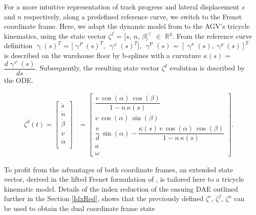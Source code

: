 \begin{sloppypar}
For a more intuitive representation of track progress and lateral displacement $s$ and $n$ respectively, along a predefined reference curve, we switch to the Frenet coordinate frame. Here, we adapt the dynamic model from \cite{kloeser_nmpc_2020} to the AGV's tricycle kinematics, using the state vector $\zeta^{f}$ = [$s$, $n$, $\beta$]$\mathrm{^{\top}}$ $\in$ $\mathbb{R}$$\mathrm{^{3}}$. From the reference curve definition $\upgamma(s)^T$ = [$\upgamma^{P}(s)^{T}$, $\upgamma^{\varphi}(s)^{T}$], $\upgamma^{\mathrm{P}}(s)$  = $[\upgamma^{x}(s), \upgamma^{y}(s)]^T$ is described on the warehouse floor by b-splines with a curvature $\kappa(s)$ =  $\dfrac{d \upgamma^{\varphi}(s)}{d{s}}$. Subsequently, the resulting state vector $\zeta^{d}$ evolution is described by the \ac{ODE}.
\end{sloppypar}
\begin{align}
    \dot{\zeta^{d}}(t) = \begin{bmatrix}
        \dot{s}\\
        \dot{n}\\
        \dot{\beta}\\
        \dot{v}\\
        \dot{\alpha}\\
    \end{bmatrix} &= 
    \begin{bmatrix}
        \dfrac{v\, \cos(\alpha)\, \cos(\beta)}{1 - n\, \kappa(s)}\\
        v\, \cos(\alpha)\, \sin(\beta)\\
        \dfrac{v}{d}\, \sin(\alpha) - \dfrac{\kappa(s)\, v\, \cos(\alpha)\, \cos(\beta)}{1 - n\, \kappa(s)}\\
        a\\
        \omega  \label{eqZetaD}
    \end{bmatrix}.
\end{align}

\par To profit from the advantages of both coordinate frames, an extended state vector, derived in the lifted Frenet formulation of \cite{reiter_frenet-cartesian_2023}, is tailored here to a tricycle kinematic model. Details of the index reduction of the ensuing \ac{DAE} outlined further in the Section \ref{IdxRed}, shows that the previously defined $\zeta^{c}$, $\zeta^{f}$, $\zeta^{u}$ can be used to obtain the dual coordinate frame state

